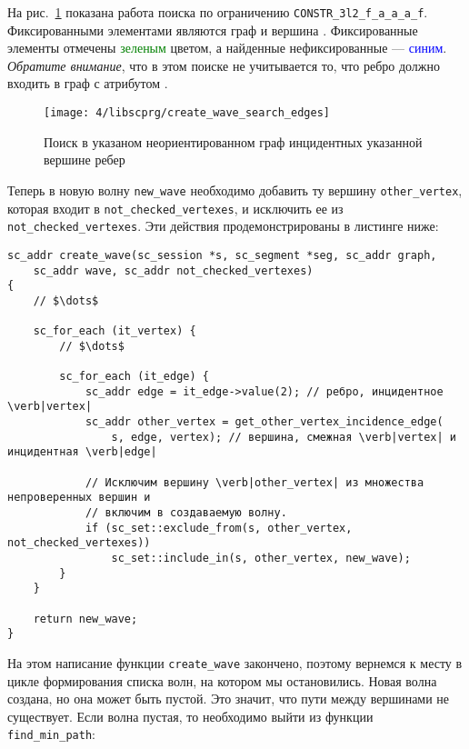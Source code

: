 На рис.~\ref{fig:create_wave_search_edges} показана работа поиска по
ограничению \lstinline|CONSTR_3l2_f_a_a_a_f|. Фиксированными
элементами являются граф  и вершина . Фиксированные
элементы отмечены \textcolor{green}{зеленым} цветом, а найденные
нефиксированные --- \textcolor{blue}{синим}. \emph{Обратите внимание},
что в этом поиске не учитывается то, что ребро должно входить в граф с
атрибутом .
\begin{figure}[h!]
  \centering
  \texttt{[image: 4/libscprg/create\_wave\_search\_edges]}
  \caption{Поиск в указаном неориентированном граф инцидентных указанной вершине ребер}
  \label{fig:create_wave_search_edges}
\end{figure}

Теперь в новую волну \lstinline|new_wave| необходимо добавить ту
вершину \lstinline|other_vertex|, которая входит в
\lstinline|not_checked_vertexes|, и исключить ее из
\lstinline|not_checked_vertexes|. Эти действия продемонстрированы в
листинге ниже:

\begin{lstlisting}[texcl]
sc_addr create_wave(sc_session *s, sc_segment *seg, sc_addr graph,
    sc_addr wave, sc_addr not_checked_vertexes)
{
    // $\dots$

    sc_for_each (it_vertex) {
        // $\dots$

        sc_for_each (it_edge) {
            sc_addr edge = it_edge->value(2); // ребро, инцидентное  \verb|vertex|
            sc_addr other_vertex = get_other_vertex_incidence_edge(
                s, edge, vertex); // вершина, смежная \verb|vertex| и инцидентная \verb|edge|

            // Исключим вершину \verb|other_vertex| из множества непроверенных вершин и
            // включим в создаваемую волну.
            if (sc_set::exclude_from(s, other_vertex, not_checked_vertexes))
                sc_set::include_in(s, other_vertex, new_wave);
        }
    }

    return new_wave;
}
\end{lstlisting}

На этом написание функции \lstinline|create_wave| закончено, поэтому
вернемся к месту в цикле формирования списка волн, на котором мы
остановились. Новая волна создана, но она может быть пустой. Это
значит, что пути между вершинами не существует. Если волна пустая, то
необходимо выйти из функции \lstinline|find_min_path|:

